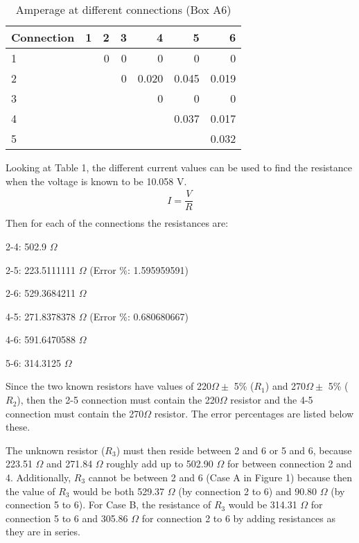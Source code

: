 \documentclass [12pt, letterpaper, twoside] {article}
\begin{document}
\begin{table}
  \centering
  \begin{tabular}{| l | r | r | r | r | r | r |}
    \hline\hline
    Connection & 1 & 2 & 3 & 4 & 5 & 6 \\
    \hline
    1 & & 0 & 0 & 0 & 0 & 0 \\
    \hline
    2 & &  & 0 & 0.020 & 0.045 & 0.019 \\
    \hline
    3 & & & & 0 & 0 & 0 \\
    \hline
    4 & & & & & 0.037 & 0.017 \\
    \hline
    5 & & & & & & 0.032 \\
    \hline\hline
  \end{tabular}
  \caption {Amperage at different connections (Box A6)}
\end{table}

Looking at Table 1, the different current values can be used to find the resistance when the voltage is known to be 10.058 V.
\begin{equation}
  \begin{split}
    I = \dfrac{V}{R} \\
  \end{split}
\end{equation}
Then for each of the connections the resistances are:

\vspace{0.5cm}
2-4: 502.9 \(\Omega\)

2-5: 223.5111111 \(\Omega\) (Error \%: 1.595959591)

2-6: 529.3684211 \(\Omega\)

4-5: 271.8378378 \(\Omega\) (Error \%: 0.680680667)

4-6: 591.6470588 \(\Omega\)

5-6: 314.3125 \(\Omega\)
\vspace{0.5cm}

Since the two known resistors have values of 220\(\Omega\pm\) 5\% (\(R_{1}\)) and 270\(\Omega\pm\) 5\% (\(R_{2}\)), then the 2-5 connection must contain the 220\(\Omega\) resistor and the 4-5 connection must contain the 270\(\Omega\) resistor. The error percentages are listed below these.

The unknown resistor (\(R_{3}\)) must then reside between 2 and 6 or 5 and 6, because 223.51 \(\Omega\) and 271.84 \(\Omega\) roughly add up to 502.90 \(\Omega\) for between connection 2 and 4. Additionally, \(R_{3}\) cannot be between 2 and 6 (Case A in Figure 1) because then the value of \(R_{3}\) would be both 529.37 \(\Omega\) (by connection 2 to 6) and 90.80 \(\Omega\) (by connection 5 to 6). For Case B, the resistance of \(R_{3}\) would be 314.31 \(\Omega\) for connection 5 to 6 and 305.86 \(\Omega\) for connection 2 to 6 by adding resistances as they are in series.
\end{document}

